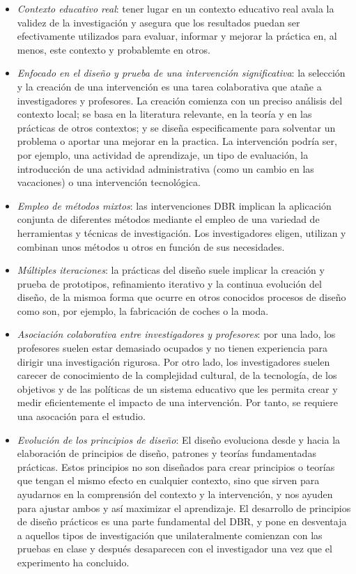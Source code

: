 \begin{itemize}
\item \emph{Contexto educativo real}: tener lugar en un contexto educativo real avala la validez de la investigación y asegura que los resultados puedan ser efectivamente utilizados para evaluar, informar y mejorar la práctica en, al menos, este contexto y probablemte en otros.
\item \emph{Enfocado en el diseño y prueba de una intervención significativa}: la selección y la creación de una intervención es una tarea colaborativa que atañe a investigadores y profesores. La creación comienza con un preciso análisis del contexto local; se basa en la literatura relevante, en la teoría y en las prácticas de otros contextos; y se diseña especificamente para solventar un problema o aportar una mejorar en la practica. La intervención podría ser, por ejemplo, una actividad de aprendizaje, un tipo de evaluación, la introducción de una actividad administrativa (como un cambio en las vacaciones) o una intervención tecnológica. %
\item \emph{Empleo de métodos mixtos}: las intervenciones DBR implican la aplicación conjunta de diferentes métodos mediante el empleo de una variedad de herramientas y técnicas de investigación. Los investigadores eligen, utilizan y combinan unos métodos u otros en función de sus necesidades.
\item \emph{Múltiples iteraciones}: la prácticas del diseño suele implicar la creación y prueba de prototipos, refinamiento iterativo y la continua evolución del diseño, de la mismoa forma que ocurre en otros conocidos procesos de diseño como son, por ejemplo, la fabricación de coches o la moda.
\item \emph{Asociación colaborativa entre investigadores y profesores}: por una lado, los profesores suelen estar demasiado ocupados y no tienen experiencia para dirigir una investigación rigurosa. Por otro lado, los investigadores suelen carecer de conocimiento de la complejidad cultural, de la tecnología, de los objetivos y de las políticas de un sistema educativo que les permita crear y medir eficientemente el impacto de una intervención. Por tanto, se requiere una asocación para el estudio.
\item \emph{Evolución de los principios de diseño}: El diseño evoluciona desde y hacia la elaboración de principios de diseño, patrones y teorías fundamentadas prácticas. Estos principios no son diseñados para crear principios o teorías que tengan el mismo efecto en cualquier contexto, sino que sirven para ayudarnos en la comprensión del contexto y la intervención, y nos ayuden para ajustar ambos y así maximizar el aprendizaje.  El desarrollo de principios de diseño prácticos es una parte fundamental del DBR, y pone en desventaja a aquellos tipos de investigación que unilateralmente comienzan con las pruebas en clase y después desaparecen con el investigador una vez que el experimento ha concluido.

\end{itemize}
